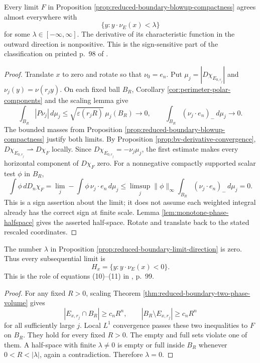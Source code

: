 \begin{proposition}\label{prop:reduced-boundary-limit-direction}
Every limit $F$ in Proposition \ref{prop:reduced-boundary-blowup-compactness} agrees almost everywhere with
\[
 \{y:y\cdot\nu_E(x)<\lambda\}
\]
for some $\lambda\in[-\infty,\infty]$. The derivative of its characteristic function in the outward direction is nonpositive. This is the sign-sensitive part of the classification on printed p.~98 of \cite{Sim18}.
\end{proposition}
\begin{proof}
Translate $x$ to zero and rotate so that $\nu_0=e_n$. Put $\mu_j=|D\chi_{E_{0,r_j}}|$ and $\nu_j(y)=\nu(r_jy)$. On each fixed ball $B_R$, Corollary \ref{cor:perimeter-polar-components} and the scaling lemma give
\[
 \int_{B_R}|P\nu_j|\,d\mu_j
 \leq\sqrt{\varepsilon(r_jR)}\,\mu_j(B_R)\longrightarrow0,
 \qquad
 \int_{B_R}(\nu_j\cdot e_n)_-\,d\mu_j\longrightarrow0.
\]
The bounded masses from Proposition \ref{prop:reduced-boundary-blowup-compactness} justify both limits. By Proposition \ref{prop:bv-derivative-convergence}, $D\chi_{E_{0,r_j}}\rightharpoonup D\chi_F$ locally. Since $D\chi_{E_{0,r_j}}=-\nu_j\mu_j$, the first estimate makes every horizontal component of $D\chi_F$ zero. For a nonnegative compactly supported scalar test $\phi$ in $B_R$,
\[
 \int\phi\,dD_n\chi_F
 =\lim_j-\int\phi\,\nu_j\cdot e_n\,d\mu_j
 \leq\limsup_j\|\phi\|_\infty
                    \int_{B_R}(\nu_j\cdot e_n)_-\,d\mu_j=0.
\]
This is a sign assertion about the limit; it does not assume each weighted integral already has the correct sign at finite scale. Lemma \ref{lem:monotone-phase-halfspace} gives the asserted half-space. Rotate and translate back to the stated rescaled coordinates.
\end{proof}

\begin{proposition}\label{prop:reduced-boundary-centered-limit}
The number $\lambda$ in Proposition \ref{prop:reduced-boundary-limit-direction} is zero. Thus every subsequential limit is
\[
 H_x=\{y:y\cdot\nu_E(x)<0\}.
\]
This is the role of equations (10)--(11) in \cite{Sim18}, p.~99.
\end{proposition}
\begin{proof}
For any fixed $R>0$, scaling Theorem \ref{thm:reduced-boundary-two-phase-volume} gives
\[
 |E_{x,r_j}\cap B_R|\geq c_nR^n,
 \qquad |B_R\setminus E_{x,r_j}|\geq c_nR^n
\]
for all sufficiently large $j$. Local $L^1$ convergence passes these two inequalities to $F$ on $B_R$. They hold for every fixed $R>0$. The empty and full sets violate one of them. A half-space with finite $\lambda\ne0$ is empty or full inside $B_R$ whenever $0<R<|\lambda|$, again a contradiction. Therefore $\lambda=0$.
\end{proof}

